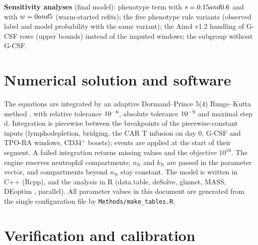 \documentclass[11pt]{article}
\begin{document}
\textbf{Sensitivity analyses} (final model): phenotype term with $s=0.15 and 0.6$ and with $w=0 and 5$ (warm-started refits); the five phenotype rule variants (observed label and model probability with the same variant); the Aim4 v1.2 handling of G-CSF rows (upper bounds) instead of the imputed windows; the subgroup without G-CSF.

\section{Numerical solution and software}
The equations are integrated by an adaptive Dormand--Prince 5(4) Runge--Kutta method \citep{dormand1980}, with relative tolerance $10^{-6}$, absolute tolerance $10^{-9}$ and maximal step \valHmax{} d. Integration is piecewise between the breakpoints of the piecewise-constant inputs (lymphodepletion, bridging, the CAR T infusion on day 0, G-CSF and TPO-RA windows, CD34$^+$ boosts); events are applied at the start of their segment. A failed integration returns missing values and the objective $10^{10}$. The engine reserves \valNTnSlots{} neutrophil compartments; $n_{\mathrm{N}}$ and $k_{\mathrm{N}}$ are passed in the parameter vector, and compartments beyond $n_{\mathrm{N}}$ stay constant. The model is written in C++ (Rcpp), and the analysis in R \valRVersion{} (data.table, deSolve, glmnet, MASS, DEoptim \valDEoptim, parallel). All parameter values in this document are generated from the single configuration file by \texttt{Methods/make\_tables.R}.

\section{Verification and calibration}\label{sec:calibration}
\end{document}
